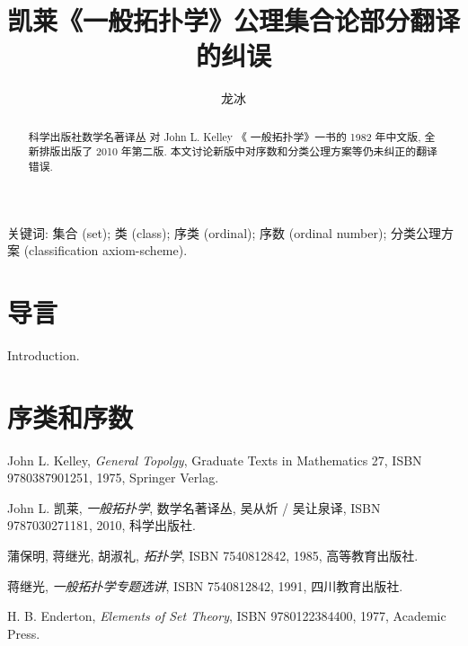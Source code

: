 \documentclass[zihao=-4,heading=true,a4paper]{ctexart}
\title{凯莱《一般拓扑学》公理集合论部分翻译的纠误}
\author{龙\quad 冰}
\date{}
\begin{document}
\maketitle
\begin{abstract}
科学出版社数学名著译丛 对 John L. Kelley 《 一般拓扑学》一书的 1982 年中文版, 全新排版出版了 2010 年第二版.
本文讨论新版中对序数和分类公理方案等仍未纠正的翻译错误.
\end{abstract}
	
关键词: 集合 (set); 类 (class); 序类 (ordinal); 
	序数 (ordinal number); 
	分类公理方案 (classification axiom-scheme).
	
	
	
\section{导言}
	Introduction.
	
\section{序类和序数 }
	
	

	
\begin{thebibliography}{9}
	John L. Kelley,  \emph{General Topolgy}, Graduate Texts in Mathematics 27, ISBN 9780387901251, 1975, Springer Verlag.
	
John L. 凯莱,  \emph{一般拓扑学}, 数学名著译丛, 吴从炘 / 吴让泉译, ISBN 9787030271181, 2010, 科学出版社.

蒲保明, 蒋继光, 胡淑礼, \emph{拓扑学}, ISBN 7540812842, 1985, 高等教育出版社.

	蒋继光, \emph{一般拓扑学专题选讲}, ISBN 7540812842, 1991, 四川教育出版社.
	
	H. B. Enderton, \emph{Elements of Set Theory}, ISBN 9780122384400, 1977, Academic Press.
\end{thebibliography}
\end{document}
